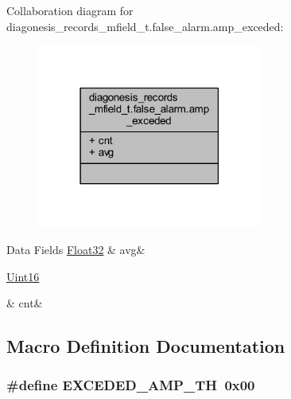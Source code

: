 Collaboration diagram for diagonesis\+\_\+records\+\_\+mfield\+\_\+t.\+false\+\_\+alarm.\+amp\+\_\+exceded\+:\nopagebreak
\begin{figure}[H]
\begin{center}
\leavevmode
\includegraphics[width=210pt]{de/dad/a00963}
\end{center}
\end{figure}
\begin{DoxyFields}{Data Fields}
\hypertarget{a00019_ae322d423f075b0ab2daad27011d24909}{\hyperlink{a00072_a87d38f886e617ced2698fc55afa07637}{Float32}}\label{a00019_ae322d423f075b0ab2daad27011d24909}
&
avg&
\\
\hline

\hypertarget{a00019_a2817f701d5e1a1181e657251363295fd}{\hyperlink{a00072_a59a9f6be4562c327cbfb4f7e8e18f08b}{Uint16}}\label{a00019_a2817f701d5e1a1181e657251363295fd}
&
cnt&
\\
\hline

\end{DoxyFields}


\subsection{Macro Definition Documentation}
\hypertarget{a00019_a9c5372190518a7d696da393f1a9a5fb9}{
\subsubsection[{E\+X\+C\+E\+D\+E\+D\+\_\+\+A\+M\+P\+\_\+\+T\+H}]{\setlength{\rightskip}{0pt plus 5cm}\#define E\+X\+C\+E\+D\+E\+D\+\_\+\+A\+M\+P\+\_\+\+T\+H~0x00}}\label{a00019_a9c5372190518a7d696da393f1a9a5fb9}


